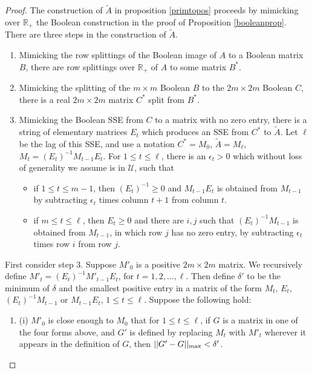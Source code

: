 \documentclass{amsart}
\theoremstyle{definition}
\theoremstyle{remark}
\numberwithin{equation}{section}
\begin{document}
{{\begin{proof} 
The construction of 
 $\widetilde{A}$ in 
proposition \ref{primtopos} proceeds by mimicking over $\mathbb R_+$ the 
Boolean construction in the proof of 
Proposition \ref{booleanprop}. There are three steps in the construction of 
$\widetilde A$.
\begin{enumerate}
\item
Mimicking the row splittings of the Boolean image of $A$ to a Boolean
matrix $B$, there are row splittings 
over $\mathbb R_+$ of $A$ to some matrix $B^*$.
\item 
Mimicking the  splitting of the $m\times m$ Boolean $B$ to the 
$2m\times 2m$ Boolean $C$,
there is  a real 
$2m\times 2m$ matrix  $C^*$ split from $B^*$.
\item
Mimicking the Boolean SSE from $C$ to a 
matrix with no zero entry, 
there is a string of elementary matrices 
$E_t$ 
which produces 
an SSE from $C^*$ to $\widetilde A$. 
Let $\ell$ be the lag of this SSE, and use a notation 
$C^*=M_0$,
$\widetilde A=M_{\ell}$, 
$M_t=(E_t)^{-1}M_{t-1}E_t$. For 
$1\leq t \leq \ell$,  
 there is an $\epsilon_t>0$ 
which without loss of generality  we assume 
is in $\mathcal U$, such that
\begin{itemize} 
\item 
if   $1\leq t \leq m-1$,
then $(E_t)^{-1}\geq 0$ and  $M_{t-1}E_t$ is obtained 
from  $M_{t-1}$  
by  subtracting $\epsilon_t$ times column  $t+1$ 
from column $t$.
\item 
if $m\leq t\leq \ell$, then $E_t\geq 0$ and 
there are $i,j$ such that 
$(E_t)^{-1}M_{t-1}$ is obtained 
from  $M_{t-1}$, in which row $j$ has no zero entry,   
by  subtracting $\epsilon_t$ times 
 row $i$ 
from row $j$.
\end{itemize}
\end{enumerate}
First consider step 3. 
Suppose $M'_0$ is a 
 positive $2m\times 2m$ matrix. 
We recursively define 
$M'_t=(E_t)^{-1}M'_{t-1}E_t$, for $t=1,2,\dots , \ell$. 
Then define 
 $\delta'$ to be the minimum of $\delta$ 
and the smallest positive entry in a matrix of the form  
$M_t$, 
$E_t$, 
$(E_t)^{-1}M_{t-1}$ or 
$M_{t-1}E_t$, 
 $1\leq t\leq \ell$.
Suppose the following hold:
\begin{enumerate}
\item[] (i)
 $M'_0$ is  close enough to $M_0$ that 
for $1\leq t\leq \ell$,  
if $G$ is a matrix in one of the four forms above, 
and $G'$ is defined by replacing 
$M_t$ with $M'_t$ wherever it appears in the definition of $G$, 
then $||G'-G||_{\textnormal{max}}<\delta'$. 

\end{enumerate}
\end{proof}}}
\end{document}
